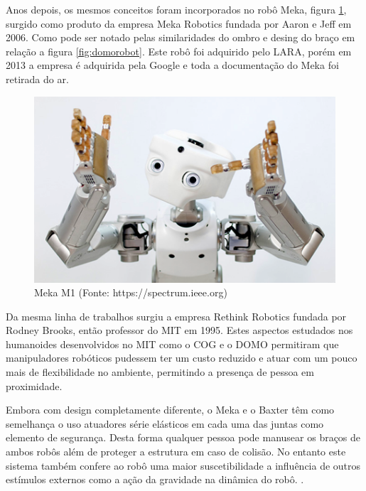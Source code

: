 Anos depois, os mesmos conceitos foram incorporados no robô Meka, figura \ref{fig:meka}, surgido como produto da empresa Meka Robotics fundada por Aaron e Jeff em 2006. Como pode ser notado pelas similaridades do ombro e desing do braço em relação a figura \ref{fig:domorobot}. Este robô foi adquirido pelo LARA, porém em 2013 a empresa é adquirida pela Google e toda a documentação do Meka foi retirada do ar. 


\begin{figure}[H]
    \centering
    \includegraphics[width=0.6\linewidth]{tex/figs/meka-robot.png}
    \caption{Meka M1 (Fonte: https://spectrum.ieee.org)}
    \label{fig:meka}
\end{figure}

Da mesma linha de trabalhos surgiu a empresa Rethink Robotics fundada por Rodney Brooks, então professor do MIT em 1995. Estes aspectos estudados nos humanoides desenvolvidos no MIT como o COG e o DOMO permitiram que manipuladores robóticos pudessem ter um custo reduzido e atuar com um pouco mais de flexibilidade no ambiente, permitindo a presença de pessoa em proximidade.


Embora com design completamente diferente, o Meka e o Baxter têm como semelhança o uso atuadores série elásticos em cada uma das juntas como elemento de segurança. Desta forma qualquer pessoa pode manusear os braços de ambos robôs além de proteger a estrutura em caso de colisão\cite{pratt1995series}. No entanto este sistema também confere ao robô uma maior suscetibilidade a influência de outros estímulos externos como a ação da gravidade na dinâmica do robô. \cite{nobody}.

